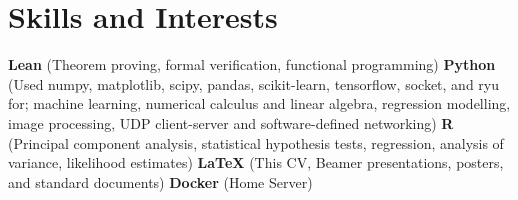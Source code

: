 \documentclass[a4paper,10pt]{letter}
\begin{document}






\section{Skills and Interests}

\textbf{Lean} (Theorem proving, formal verification, functional programming)
\textbf{Python} (Used numpy, matplotlib, scipy, pandas, scikit-learn, tensorflow, socket, and ryu for; machine learning, numerical calculus and linear algebra, regression modelling, image processing, UDP client-server and software-defined networking) 
\textbf{R} (Principal component analysis, statistical hypothesis tests, regression, analysis of variance, likelihood estimates) 
\textbf{LaTeX} (This CV, Beamer presentations, posters, and standard documents) 
\textbf{Docker} (Home Server)
\end{document}
